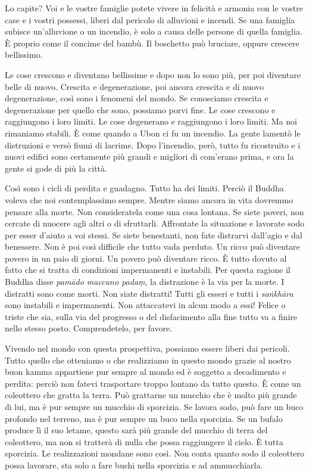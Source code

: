 Lo capite? Voi e le vostre famiglie potete vivere in felicità e armonia
con le vostre case e i vostri possessi, liberi dal pericolo di alluvioni
e incendi. Se una famiglia subisce un'alluvione o un incendio, è solo a
causa delle persone di quella famiglia. È proprio come il concime del
bambù. Il boschetto può bruciare, oppure crescere bellissimo.

Le cose crescono e diventano bellissime e dopo non lo sono più, per poi
diventare belle di nuovo. Crescita e degenerazione, poi ancora crescita
e di nuovo degenerazione, così sono i fenomeni del mondo. Se conosciamo
crescita e degenerazione per quello che sono, possiamo porvi fine. Le
cose crescono e raggiungono i loro limiti. Le cose degenerano e
raggiungono i loro limiti. Ma noi rimaniamo stabili. È come quando a
Ubon ci fu un incendio. La gente lamentò le distruzioni e versò fiumi di
lacrime. Dopo l'incendio, però, tutto fu ricostruito e i nuovi edifici
sono certamente più grandi e migliori di com'erano prima, e ora la gente
si gode di più la città.

Così sono i cicli di perdita e guadagno. Tutto ha dei limiti. Perciò il
Buddha voleva che noi contemplassimo sempre. Mentre siamo ancora in vita
dovremmo pensare alla morte. Non consideratela come una cosa lontana. Se
siete poveri, non cercate di nuocere agli altri o di sfruttarli.
Affrontate la situazione e lavorate sodo per esser d'aiuto a voi stessi.
Se siete benestanti, non fate distrarvi dall'agio e dal benessere. Non è
poi così difficile che tutto vada perduto. Un ricco può diventare povero
in un paio di giorni. Un povero può diventare ricco. È tutto dovuto al
fatto che si tratta di condizioni impermanenti e instabili. Per questa
ragione il Buddha disse \emph{pamādo maccuno padaṃ}, la distrazione è la
via per la morte. I distratti sono come morti. Non siate distratti!
Tutti gli esseri e tutti i \emph{saṅkhāra} sono instabili e
impermanenti. Non attaccatevi in alcun modo a essi! Felice o triste che
sia, sulla via del progresso o del disfacimento alla fine tutto va a
finire nello stesso posto. Comprendetelo, per favore.

Vivendo nel mondo con questa prospettiva, possiamo essere liberi dai
pericoli. Tutto quello che otteniamo o che realizziamo in questo mondo
grazie al nostro buon kamma appartiene pur sempre al mondo ed è
soggetto a decadimento e perdita: perciò non fatevi trasportare troppo
lontano da tutto questo. È come un coleottero che gratta la terra. Può
grattarne un mucchio che è molto più grande di lui, ma è pur sempre un
mucchio di sporcizia. Se lavora sodo, può fare un buco profondo nel
terreno, ma è pur sempre un buco nella sporcizia. Se un bufalo produce
lì il suo letame, questo sarà più grande del mucchio di terra del
coleottero, ma non si tratterà di nulla che possa raggiungere il cielo.
È tutta sporcizia. Le realizzazioni mondane sono così. Non conta quanto
sodo il coleottero possa lavorare, sta solo a fare buchi nella sporcizia
e ad ammucchiarla.

